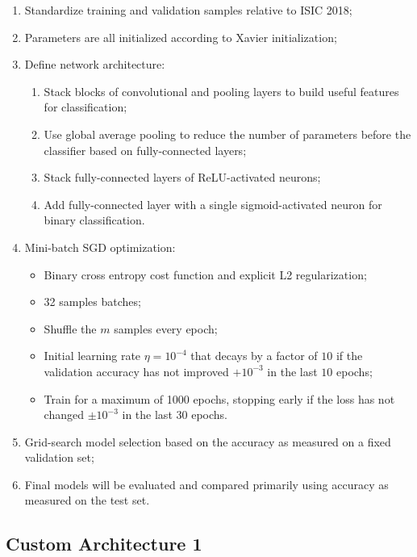 \begin{enumerate}
    \item Standardize training and validation samples relative to ISIC 2018;
    \item Parameters are all initialized according to Xavier initialization;
    \item Define network architecture:
        \begin{enumerate}
            \item Stack blocks of convolutional and pooling layers to build useful features for classification;
            \item Use global average pooling to reduce the number of parameters before the classifier based on fully-connected layers;
            \item Stack fully-connected layers of ReLU-activated neurons;
            \item Add fully-connected layer with a single sigmoid-activated neuron for binary classification.
        \end{enumerate}
    \item Mini-batch \ac{SGD} optimization:
        \begin{itemize}
            \item Binary cross entropy cost function and explicit L2 regularization;
            \item 32 samples batches;
            \item Shuffle the $m$ samples every epoch;
            \item Initial learning rate $\eta = 10^{-4}$ that decays by a factor of $10$ if the validation accuracy has not improved $+10^{-3}$ in the last $10$ epochs;
            \item Train for a maximum of 1000 epochs, stopping early if the loss has not changed $\pm 10^{-3}$ in the last $30$ epochs.
        \end{itemize}
    \item Grid-search model selection based on the accuracy as measured on a fixed validation set;
    \item Final models will be evaluated and compared primarily using accuracy as measured on the test set.
\end{enumerate}

\subsection{Custom Architecture 1}

